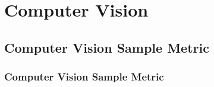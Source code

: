 \chapter{Computer Vision}


\clearpage
\thispagestyle{clusteringstyle}
\section{Computer Vision Sample Metric}
\subsection{Computer Vision Sample Metric}